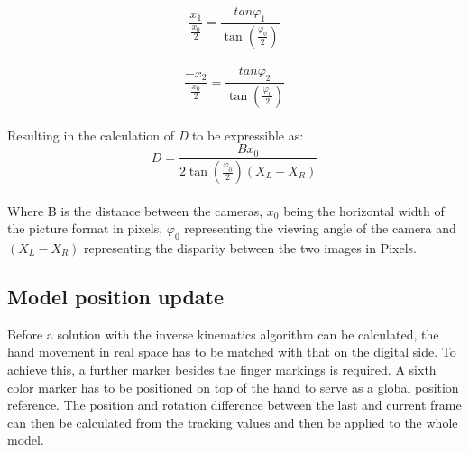 \begin{equation}
\frac{x_{1}}{\frac{x_{0}}{2}}=\frac{tan \varphi_1}{\tan(\frac{\varphi_{0}}{2})}
\end{equation}\\
\begin{equation}
\frac{-x_{2}}{\frac{x_{0}}{2}}=\frac{tan \varphi_2}{\tan(\frac{\varphi_{0}}{2})}
\end{equation}\\
Resulting in the calculation of \textit{D} to be expressible as:
\begin{equation}
D=\frac{Bx_0}{2\tan(\frac{\varphi_0}{2})(X_{L}-X_{R})}
\end{equation}\\
Where B is the distance between the cameras, $x_0$ being the horizontal width of the picture format in pixels, $\varphi_0$ representing the viewing angle of the camera and $(X_{L}-X_{R})$ representing the disparity between the two images in Pixels.
\subsection{Model position update}
Before a solution with the inverse kinematics algorithm can be calculated, the hand movement in real space has to be matched with that on the digital side. To achieve this, a further marker besides the finger markings is required. A sixth color marker has to be positioned on top of the hand to serve as a global position reference. The position and rotation difference between the last and current frame can then be calculated from the tracking values and then be applied to the whole model.
